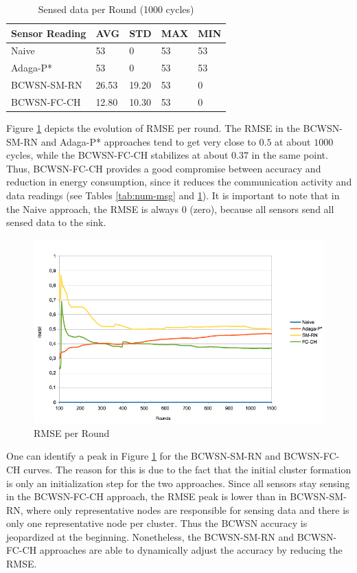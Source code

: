 \documentclass{acm_proc_article-sp}
\begin{document}
\begin{table}[h!]
\caption{Sensed data per Round (1000 cycles)}
\label{tab:sens-read}
\begin{center}
\begin{tabular}{|l||l|l|l|l|}
\hline
Sensor Reading &AVG &STD &MAX &MIN \\
\hline\hline
Naive &53 &0 &53 &53 \\
\hline
Adaga-P* &53 &0 &53 &53 \\
\hline
BCWSN-SM-RN &26.53 &19.20 &53 &0 \\
\hline
BCWSN-FC-CH &12.80 &10.30 &53 &0 \\
\hline
\end{tabular}
\end{center}
\end{table}


Figure \ref{fig:rmse} depicts the evolution of RMSE per round. The RMSE in the
BCWSN-SM-RN and Adaga-P* approaches tend to get very close to $0.5$ at about $1000$
cycles, while the BCWSN-FC-CH stabilizes at about $0.37$ in the same point. Thus,
BCWSN-FC-CH provides a good compromise between accuracy and reduction in energy
consumption, since it reduces the communication activity and data readings (see
Tables \ref{tab:num-msg} and \ref{tab:sens-read}). It is important to note that
in the Naive approach, the RMSE is always 0 (zero), because all sensors send all
sensed data to the sink.

\begin{figure}[!htb]
\centering
	\includegraphics[scale=0.33]{WsneeFD_RMSE.png}
    \caption{RMSE per Round}
    \label{fig:rmse}
\end{figure}

One can identify a peak in Figure \ref{fig:rmse} for the BCWSN-SM-RN and
BCWSN-FC-CH curves. The reason for this is due to the fact that the initial
cluster formation is only an initialization step for the two approaches.
Since all sensors stay sensing in the BCWSN-FC-CH approach, the RMSE peak is
lower than in BCWSN-SM-RN, where only representative nodes are responsible for
sensing data and there is only one representative node per cluster.
Thus the BCWSN accuracy is jeopardized at the beginning. Nonetheless, the
BCWSN-SM-RN and BCWSN-FC-CH approaches are able to dynamically adjust the
accuracy by reducing the RMSE.
\end{document}
